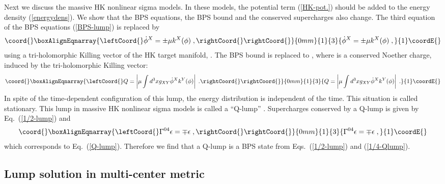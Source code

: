 \documentclass[a4paper,12pt]{article}
\begin{document}
Next we discuss the massive HK nonlinear sigma models. 
In these models, the potential term (\ref{HK-pot.}) 
should be added to the energy density (\ref{energydens}).  
We show that the BPS equations, 
the BPS bound and the conserved 
supercharges also change. 
The third equation of the BPS equations (\ref{BPS-lump}) 
is replaced by \cite{Abraham}
\begin{eqnarray}\coord{}\boxAlignEqnarray{\leftCoord{}
  \dot{\phi}^X = \pm \mu k^X (\phi) \;, \rightCoord{}
\label{Q-lump}
\rightCoord{}}{0mm}{1}{3}{
  \dot{\phi}^X = \pm \mu k^X (\phi) \;, 
}{1}\coordE{}\end{eqnarray}
using a tri-holomorphic Killing vector 
of the HK target manifold, \coordHE{}.
The BPS bound is replaced to \coordHE{}, 
where \coordHE{} is a conserved Noether charge, induced by 
the tri-holomorphic Killing vector:  
\begin{eqnarray}\coord{}\boxAlignEqnarray{\leftCoord{}
  Q = \left| \mu \int d^3x g_{XY}\dot{\phi}^X k^Y(\phi) \right| \;.\rightCoord{}
  \label{eq:topological_charge}
\rightCoord{}}{0mm}{1}{3}{
  Q = \left| \mu \int d^3x g_{XY}\dot{\phi}^X k^Y(\phi) \right| \;.
  }{1}\coordE{}\end{eqnarray}
In spite of the time-dependent configuration of this lump, 
the energy distribution is independent of the time.  
This situation is called stationary. 
This lump in massive HK nonlinear sigma models is called 
a ``Q-lump'' \cite{Abraham}.
Supercharges conserved by a Q-lump is 
given by Eq.~(\ref{1/2-lump}) and 
\begin{eqnarray}\coord{}\boxAlignEqnarray{\leftCoord{}
 \Gamma^{04}\epsilon = \mp\epsilon \;, \rightCoord{}
\label{1/4-Qlump}
\rightCoord{}}{0mm}{1}{3}{
 \Gamma^{04}\epsilon = \mp\epsilon \;, 
}{1}\coordE{}\end{eqnarray}
which corresponds to Eq.~(\ref{Q-lump}).
Therefore we find that 
a Q-lump is a \coordHE{} BPS state from Eqs.~(\ref{1/2-lump}) and 
(\ref{1/4-Qlump}). 


\subsection{Lump solution in multi-center metric}\label{sc:Multi}
\end{document}
